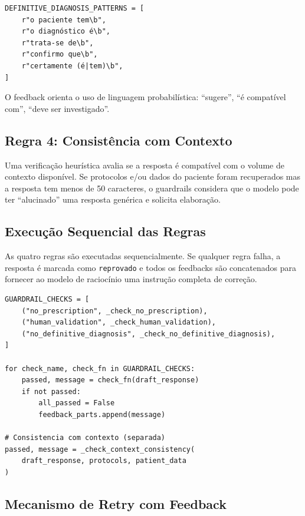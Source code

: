 \begin{lstlisting}[caption={Padrões regex para detecção de diagnóstico definitivo.}]
DEFINITIVE_DIAGNOSIS_PATTERNS = [
    r"o paciente tem\b",
    r"o diagnóstico é\b",
    r"trata-se de\b",
    r"confirmo que\b",
    r"certamente (é|tem)\b",
]
\end{lstlisting}

O feedback orienta o uso de linguagem probabilística: ``sugere'', ``é compatível com'', ``deve ser investigado''.

\subsection{Regra 4: Consistência com Contexto}

Uma verificação heurística avalia se a resposta é compatível com o volume de contexto disponível. Se protocolos e/ou dados do paciente foram recuperados mas a resposta tem menos de 50 caracteres, o guardrails considera que o modelo pode ter ``alucinado'' uma resposta genérica e solicita elaboração.

\subsection{Execução Sequencial das Regras}

As quatro regras são executadas sequencialmente. Se qualquer regra falha, a resposta é marcada como \texttt{reprovado} e todos os feedbacks são concatenados para fornecer ao modelo de raciocínio uma instrução completa de correção.

\begin{lstlisting}[caption={Pipeline de validação dos guardrails.}]
GUARDRAIL_CHECKS = [
    ("no_prescription", _check_no_prescription),
    ("human_validation", _check_human_validation),
    ("no_definitive_diagnosis", _check_no_definitive_diagnosis),
]

for check_name, check_fn in GUARDRAIL_CHECKS:
    passed, message = check_fn(draft_response)
    if not passed:
        all_passed = False
        feedback_parts.append(message)

# Consistencia com contexto (separada)
passed, message = _check_context_consistency(
    draft_response, protocols, patient_data
)
\end{lstlisting}

\subsection{Mecanismo de Retry com Feedback}

